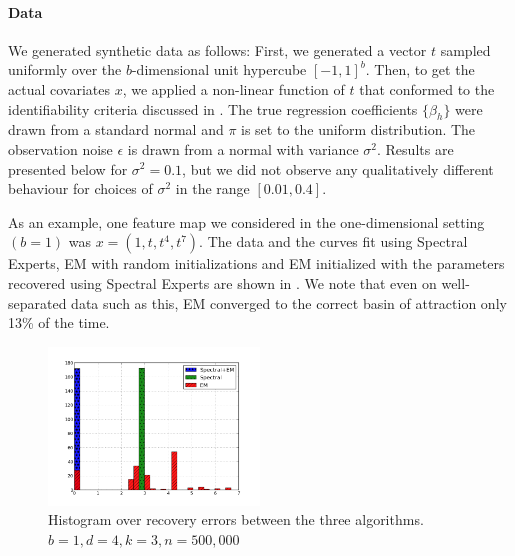 \paragraph{Data}

We generated synthetic data as follows:
First, we generated a vector $t$ sampled uniformly over the $b$-dimensional
unit hypercube $[-1,1]^b$.
Then, to get the actual covariates $x$, we applied a non-linear function of $t$
that conformed to the identifiability criteria discussed in
.
The true regression coefficients $\{\beta_h\}$ were drawn from a standard normal
and $\pi$ is set to the uniform distribution.
The observation noise $\epsilon$ is drawn from a normal with variance $\sigma^2$.
Results are presented below for $\sigma^2 = 0.1$, but we did not observe any
qualitatively different behaviour for choices of $\sigma^2$ in the range
$[0.01, 0.4]$.  

As an example, one feature map we considered in the one-dimensional
setting $(b=1)$ was $x = (1, t, t^4, t^7)$. The data and the curves fit using
Spectral Experts, EM with random initializations and EM initialized with
the parameters recovered using Spectral Experts are shown in
. We note that even on well-separated data such as
this, EM converged to the correct basin of attraction only 13\% of the time.

\begin{figure}[t]
  \centering
  \includegraphics[width=0.50\textwidth]{figures/hist.png}
  \caption{Histogram over recovery errors between the three algorithms. $b = 1, d = 4, k = 3, n = 500,000$}
  \label{fig:hist}
\end{figure}


